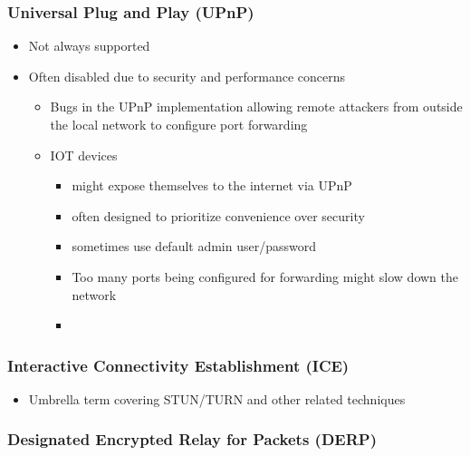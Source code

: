 \subsubsection{Universal Plug and Play (UPnP)}\label{notes__02021-internet-protocol.md__universal-plug-and-play-upnp}

\begin{itemize}
\tightlist
\item
  Not always supported
\item
  Often disabled due to security and performance concerns

  \begin{itemize}
  \tightlist
  \item
    Bugs in the UPnP implementation allowing remote attackers from outside the local network to configure port forwarding
  \item
    IOT devices

    \begin{itemize}
    \tightlist
    \item
      might expose themselves to the internet via UPnP
    \item
      often designed to prioritize convenience over security
    \item
      sometimes use default admin user/password
    \item
      Too many ports being configured for forwarding might slow down the network
    \item
    \end{itemize}
  \end{itemize}
\end{itemize}

\subsubsection{Interactive Connectivity Establishment (ICE)}\label{notes__02021-internet-protocol.md__interactive-connectivity-establishment-ice}

\begin{itemize}
\tightlist
\item
  Umbrella term covering STUN/TURN and other related techniques
\end{itemize}

\subsubsection{Designated Encrypted Relay for Packets (DERP)}\label{notes__02021-internet-protocol.md__designated-encrypted-relay-for-packets-derp}

